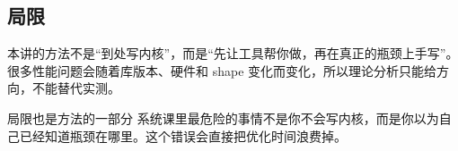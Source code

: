 \subsection{局限}

本讲的方法不是“到处写内核”，而是“先让工具帮你做，再在真正的瓶颈上手写”。很多性能问题会随着库版本、硬件和 shape 变化而变化，所以理论分析只能给方向，不能替代实测。

\begin{knowledgebox}{局限也是方法的一部分}
系统课里最危险的事情不是你不会写内核，而是你以为自己已经知道瓶颈在哪里。这个错误会直接把优化时间浪费掉。
\end{knowledgebox}


